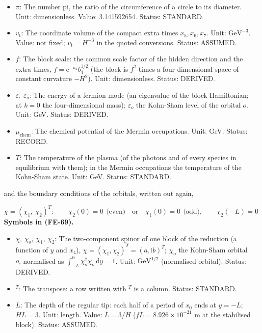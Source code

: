 \documentclass[
  10pt,
]{article}
\providecommand{\tightlist}{%
  \setlength{\itemsep}{0pt}\setlength{\parskip}{0pt}}
\begin{document}
\begin{itemize}
  Kohn-Sham cell. Unit: GeV. Value: \(0.25\,H\). Status: RECORD.
\item
  \(\pi\): The number pi, the ratio of the circumference of a circle to
  its diameter. Unit: dimensionless. Value: 3.141592654. Status:
  STANDARD.
\item
  \(v_{\mathrm{t}}\): The coordinate volume of the compact extra times
  \(x_5, x_6, x_7\). Unit: \(\mathrm{GeV}^{-3}\). Value: not fixed;
  \(v_{\mathrm{t}} = H^{-3}\) in the quoted conversions. Status:
  ASSUMED.
\item
  \(f\): The block scale: the common scale factor of the hidden
  direction and the extra times, \(f = \mathrm{e}^{-a_4}b_4^{1/2}\) (the
  block is \(f^2\) times a four-dimensional space of constant curvature
  \(-H^2\)). Unit: dimensionless. Status: DERIVED.
\item
  \(\varepsilon,\ \varepsilon_o\): The energy of a fermion mode (an
  eigenvalue of the block Hamiltonian; at \(k = 0\) the four-dimensional
  mass); \(\varepsilon_o\) the Kohn-Sham level of the orbital \(o\).
  Unit: GeV. Status: DERIVED.
\item
  \(\mu_{\mathrm{chem}}\): The chemical potential of the Mermin
  occupations. Unit: GeV. Status: RECORD.
\item
  \(T\): The temperature of the plasma (of the photons and of every
  species in equilibrium with them); in the Mermin occupations the
  temperature of the Kohn-Sham state. Unit: GeV. Status: STANDARD.
\end{itemize}

and the boundary conditions of the orbitals, written out again,

\[
\chi = (\chi_1,\ \chi_2)^T:\qquad \chi_2(0) = 0\ \ \text{(even)}\quad\text{or}\quad \chi_1(0) =
 0\ \ \text{(odd)},\qquad
\chi_2(-L) = 0 \tag{FE-69}
\] \textbf{Symbols in (FE-69).}

\begin{itemize}
\tightlist
\item
  \(\chi,\ \chi_o,\ \chi_1,\ \chi_2\): The two-component spinor of one
  block of the reduction (a function of \(y\) and \(x_4\)),
  \(\chi = (\chi_1, \chi_2)^T = (a, \mathrm{i}b)^T\); \(\chi_o\) the
  Kohn-Sham orbital \(o\), normalised as
  \(\int_{-L}^{0}\chi_o^\dagger\chi_o\,\mathrm{d}y = 1\). Unit:
  \(\mathrm{GeV}^{1/2}\) (normalised orbital). Status: DERIVED.
\item
  \({}^T\): The transpose: a row written with \(^T\) is a column.
  Status: STANDARD.
\item
  \(L\): The depth of the regular tip: each half of a period of \(x_0\)
  ends at \(y = -L\); \(HL = 3\). Unit: length. Value: \(L = 3/H\)
  (\(fL = 8.926\times10^{-21}\) m at the stabilised block). Status:
  ASSUMED.
\end{itemize}
\end{document}
